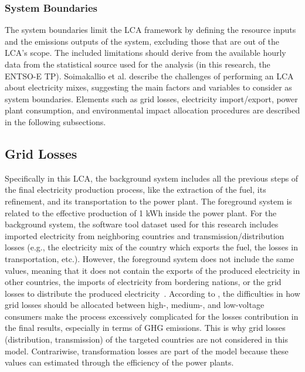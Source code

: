 \subsubsection{System Boundaries} \label{SB}
The system boundaries limit the LCA framework by defining the resource inputs and the emissions outputs of the system, excluding those that are out of the LCA's scope. The included limitations should derive from the available hourly data from the statistical source used for the analysis (in this research, the ENTSO-E TP). Soimakallio et al. \cite{Soimakallio2011} describe the challenges of performing an LCA about electricity mixes, suggesting the main factors and variables to consider as system boundaries. Elements such as grid losses, electricity import/export, power plant consumption, and environmental impact allocation procedures are described in the following subsections. 

\subsection*{Grid Losses} 
Specifically in this LCA, the background system includes all the previous steps of the final electricity production process, like the extraction of the fuel, its refinement, and its transportation to the power plant. The foreground system is related to the effective production of 1 kWh inside the power plant. For the background system, the software tool dataset used for this research includes imported electricity from neighboring countries and transmission/distribution losses (e.g., the electricity mix of the country which exports the fuel, the losses in transportation, etc.). However, the foreground system does not include the same values, meaning that it does not contain the exports of the produced electricity in other countries, the imports of electricity from bordering nations, or the grid losses to distribute the produced electricity~\cite{PEInternational2014GaBiV6}. According to \cite{Soimakallio2011}, the difficulties in how  grid losses should be allocated between high-, medium-, and low-voltage consumers make the process excessively complicated for the losses contribution in the final results, especially in terms of GHG emissions. This is why grid losses (distribution, transmission) of the targeted countries are not considered in this model. Contrariwise, transformation losses are part of the model because these values can estimated through the efficiency of the power plants. 

